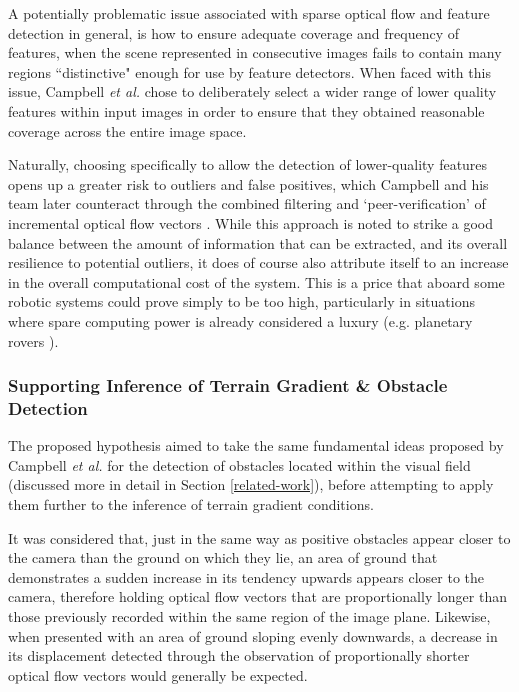 A potentially problematic issue associated with sparse optical flow and feature detection in general, is how to ensure adequate coverage and frequency of features, when the scene represented in consecutive images fails to contain many regions ``distinctive" enough for use by feature detectors. When faced with this issue, Campbell \textit{et al.} \cite{campbell} chose to deliberately select a wider range of lower quality features within input images in order to ensure that they obtained reasonable coverage across the entire image space. 

Naturally, choosing specifically to allow the detection of lower-quality features opens up a greater risk to outliers and false positives, which Campbell and his team later counteract through the combined filtering and `peer-verification' of incremental optical flow vectors \cite{campbell}. While this approach is noted to strike a good balance between the amount of information that can be extracted, and its overall resilience to potential outliers, it does of course also attribute itself to an increase in the overall computational cost of the system. This is a price that aboard some robotic systems could prove simply to be too high, particularly in situations where spare computing power is already considered a luxury (e.g. planetary rovers \cite{mer}). 

\subsubsection{Supporting Inference of Terrain Gradient \& Obstacle Detection}

The proposed hypothesis aimed to take the same fundamental ideas proposed by Campbell \textit{et al.} \cite{campbell} for the detection of obstacles located within the visual field (discussed more in detail in Section \ref{related-work}), before attempting to apply them further to the inference of terrain gradient conditions. 

It was considered that, just in the same way as positive obstacles appear closer to the camera than the ground on which they lie, an area of ground that demonstrates a sudden increase in its tendency upwards appears closer to the camera, therefore holding optical flow vectors that are proportionally longer than those previously recorded within the same region of the image plane. Likewise, when presented with an area of ground sloping evenly downwards, a decrease in its displacement detected through the observation of proportionally shorter optical flow vectors would generally be expected.  


